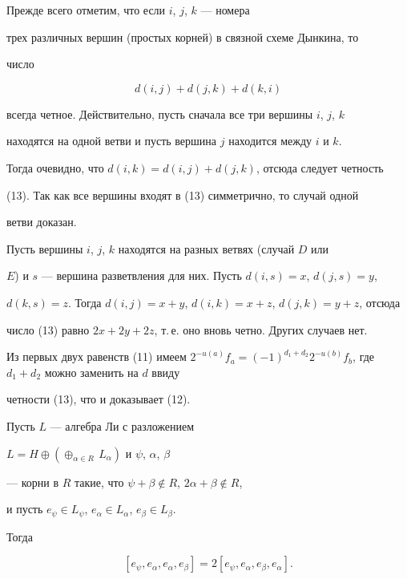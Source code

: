 \begin{pf}


Прежде всего отметим, что если $i$, $j$, $k$ --- номера


трех различных вершин (простых корней) в связной схеме Дынкина, то


число


\begin{equation}


d(i,j)+d(j,k)+d(k,i)


\end{equation}


всегда четное. Действительно, пусть сначала все три вершины $i$, $j$, $k$


находятся на одной ветви и пусть вершина $j$ находится между $i$ и $k$.


Тогда очевидно, что $d(i,k)=d(i,j)+d(j,k)$, отсюда следует четность


(13). Так как все вершины входят в (13) симметрично, то случай одной


ветви доказан.





Пусть вершины $i$, $j$, $k$ находятся на разных ветвях (случай $D$ или


$E$) и $s$ --- вершина разветвления для них. Пусть $d(i,s)=x$, $d(j,s)=y$,


$d(k,s)=z$. Тогда $d(i,j)=x+y$, $d(i,k)=x+z$, $d(j,k)=y+z$, отсюда


число (13) равно $2x+2y+2z$, т.\,е. оно вновь четно. Других случаев нет.





Из первых двух равенств (11) имеем $2^{-u(a)}f_a=


(-1)^{d_1+d_2}2^{-u(b)}f_b$, где $d_1+d_2$ можно заменить на $d$ ввиду


четности (13), что и доказывает (12).


\end{pf}





\begin{lem}


Пусть $L$ --- алгебра Ли с разложением


$L=H\oplus(\oplus_{\alpha\in R}\,L_\alpha)$ и $\psi$, $\alpha$, $\beta$


--- корни в $R$ такие, что $\psi+\beta\notin R$, $2\alpha+\beta\notin R$,


и пусть $e_\psi\in L_\psi$, $e_\alpha\in L_\alpha$, $e_\beta\in L_\beta$.


Тогда


\begin{equation}


[e_\psi,e_\alpha,e_\alpha,e_\beta]=2[e_\psi,e_\alpha,e_\beta,e_\alpha].


\end{equation}


\end{lem}





